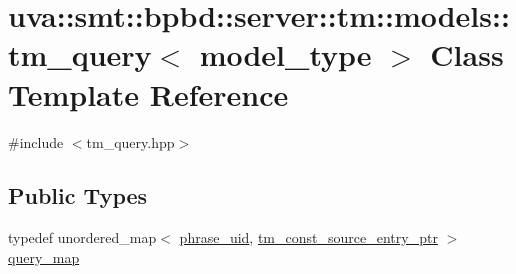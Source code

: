 \hypertarget{classuva_1_1smt_1_1bpbd_1_1server_1_1tm_1_1models_1_1tm__query}{}\section{uva\+:\+:smt\+:\+:bpbd\+:\+:server\+:\+:tm\+:\+:models\+:\+:tm\+\_\+query$<$ model\+\_\+type $>$ Class Template Reference}
\label{classuva_1_1smt_1_1bpbd_1_1server_1_1tm_1_1models_1_1tm__query}


{\ttfamily \#include $<$tm\+\_\+query.\+hpp$>$}

\subsection*{Public Types}
\begin{DoxyCompactItemize}
\item 
typedef unordered\+\_\+map$<$ \hyperlink{namespaceuva_1_1smt_1_1bpbd_1_1server_ad18d4cdf5504e76c22b0c124ff60b44f}{phrase\+\_\+uid}, \hyperlink{namespaceuva_1_1smt_1_1bpbd_1_1server_1_1tm_1_1models_a841bb11e4e9f70fbde7a8ca1ae533681}{tm\+\_\+const\+\_\+source\+\_\+entry\+\_\+ptr} $>$ \hyperlink{classuva_1_1smt_1_1bpbd_1_1server_1_1tm_1_1models_1_1tm__query_a9b383019bf72b54499ae3880d409e19b}{query\+\_\+map}
\end{DoxyCompactItemize}

